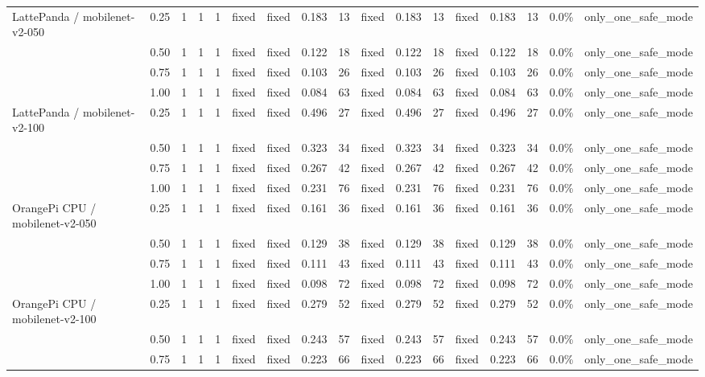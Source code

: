 \documentclass[10pt]{article}
\begin{document}
\begin{center}
\begin{longtable}{@{}l l r r r l l r r l r r l r r r l@{}}
\addlinespace[2pt]
LattePanda / mobilenet-v2-050 & 0.25 & 1 & 1 & 1 & fixed & fixed & 0.183 & 13 & fixed & 0.183 & 13 & fixed & 0.183 & 13 & 0.0\% & only\_one\_safe\_mode \\
 & 0.50 & 1 & 1 & 1 & fixed & fixed & 0.122 & 18 & fixed & 0.122 & 18 & fixed & 0.122 & 18 & 0.0\% & only\_one\_safe\_mode \\
 & 0.75 & 1 & 1 & 1 & fixed & fixed & 0.103 & 26 & fixed & 0.103 & 26 & fixed & 0.103 & 26 & 0.0\% & only\_one\_safe\_mode \\
 & 1.00 & 1 & 1 & 1 & fixed & fixed & 0.084 & 63 & fixed & 0.084 & 63 & fixed & 0.084 & 63 & 0.0\% & only\_one\_safe\_mode \\
\addlinespace[2pt]
LattePanda / mobilenet-v2-100 & 0.25 & 1 & 1 & 1 & fixed & fixed & 0.496 & 27 & fixed & 0.496 & 27 & fixed & 0.496 & 27 & 0.0\% & only\_one\_safe\_mode \\
 & 0.50 & 1 & 1 & 1 & fixed & fixed & 0.323 & 34 & fixed & 0.323 & 34 & fixed & 0.323 & 34 & 0.0\% & only\_one\_safe\_mode \\
 & 0.75 & 1 & 1 & 1 & fixed & fixed & 0.267 & 42 & fixed & 0.267 & 42 & fixed & 0.267 & 42 & 0.0\% & only\_one\_safe\_mode \\
 & 1.00 & 1 & 1 & 1 & fixed & fixed & 0.231 & 76 & fixed & 0.231 & 76 & fixed & 0.231 & 76 & 0.0\% & only\_one\_safe\_mode \\
\addlinespace[2pt]
OrangePi CPU / mobilenet-v2-050 & 0.25 & 1 & 1 & 1 & fixed & fixed & 0.161 & 36 & fixed & 0.161 & 36 & fixed & 0.161 & 36 & 0.0\% & only\_one\_safe\_mode \\
 & 0.50 & 1 & 1 & 1 & fixed & fixed & 0.129 & 38 & fixed & 0.129 & 38 & fixed & 0.129 & 38 & 0.0\% & only\_one\_safe\_mode \\
 & 0.75 & 1 & 1 & 1 & fixed & fixed & 0.111 & 43 & fixed & 0.111 & 43 & fixed & 0.111 & 43 & 0.0\% & only\_one\_safe\_mode \\
 & 1.00 & 1 & 1 & 1 & fixed & fixed & 0.098 & 72 & fixed & 0.098 & 72 & fixed & 0.098 & 72 & 0.0\% & only\_one\_safe\_mode \\
\addlinespace[2pt]
OrangePi CPU / mobilenet-v2-100 & 0.25 & 1 & 1 & 1 & fixed & fixed & 0.279 & 52 & fixed & 0.279 & 52 & fixed & 0.279 & 52 & 0.0\% & only\_one\_safe\_mode \\
 & 0.50 & 1 & 1 & 1 & fixed & fixed & 0.243 & 57 & fixed & 0.243 & 57 & fixed & 0.243 & 57 & 0.0\% & only\_one\_safe\_mode \\
 & 0.75 & 1 & 1 & 1 & fixed & fixed & 0.223 & 66 & fixed & 0.223 & 66 & fixed & 0.223 & 66 & 0.0\% & only\_one\_safe\_mode \\

\end{longtable}
\end{center}
\end{document}
